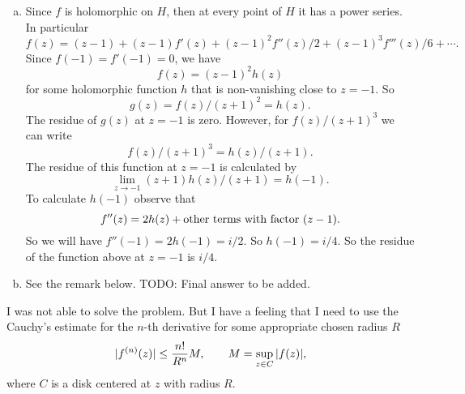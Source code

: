 \begin{solution}
	\begin{enumerate}[(a)]
		\item Since $ f $ is holomorphic on $ H $, then at every point of $ H $ it has a power series. In particular
		\[ f(z) = (z-1) + (z-1)f'(z) + (z-1)^2f''(z)/2 + (z-1)^3f'''(z)/6 + \cdots. \]
		Since $ f(-1) = f'(-1) = 0 $, we have
		\[ f(z) = (z-1)^2h(z) \]
		for some holomorphic function $ h $ that is non-vanishing close to $ z=-1 $. So
		\[ g(z) = f(z)/(z+1)^2 = h(z). \]
		The residue of $ g(z) $ at $ z=-1 $ is zero. However, for $ f(z)/(z+1)^3 $ we can write
		\[ f(z)/(z+1)^3 = h(z)/(z+1). \]
		The residue of this function at $ z =-1 $ is calculated by
		\[ \lim_{z\to -1}(z+1)h(z)/(z+1) = h(-1). \]
		To calculate $ h(-1) $ observe that 
		\[ f''(z)  = 2h(z) + \text{other terms with factor $ (z-1) $}. \]
		So we will have $ f''(-1) = 2h(-1) = i/2 $. So $ h(-1) = i/4 $. So the residue of the function above at $ z = -1 $ is $ i/4 $.
		\item See the remark below. {\color{red} \noindent TODO: Final answer to be added.}
	\end{enumerate}
\end{solution}
\begin{remark}
	I was not able to solve the problem. But I have a feeling that I need to use the Cauchy's estimate for the $ n $-th derivative for some appropriate chosen radius $ R $
	\[ |f^{(n)}(z)| \leq \frac{n!}{R^n}M, \qquad M = \sup_{z\in C}|f(z)|, \]
	where $ C $ is a disk centered at $ z $ with radius $ R $.
\end{remark}


